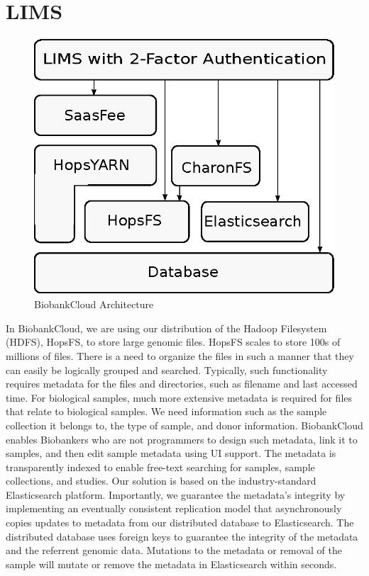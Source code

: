 \section{LIMS}

 \begin{figure}[h]
 \centering
 \includegraphics[scale=0.8]{./imgs/stack.eps}
 \caption{BiobankCloud Architecture}
 \label{fig:lim}
\end{figure}


In BiobankCloud, we are using our distribution of the Hadoop Filesystem (HDFS), HopsFS, to store large genomic files. HopsFS scales to store 100s of millions of files. There is a need to organize the files in such a manner that they can easily be logically grouped and searched. Typically, such functionality requires metadata for the files and directories, such as filename and last accessed time. For biological samples, much more extensive metadata is required for files that relate to biological samples. We need information such as the sample collection it belongs to, the type of sample, and donor information. BiobankCloud enables Biobankers who are not programmers to design such metadata, link it to samples, and then edit sample metadata using UI support. The metadata is transparently indexed to enable free-text searching for samples, sample collections, and studies. Our solution is based on the industry-standard Elasticsearch platform. Importantly, we guarantee the metadata's integrity by implementing an eventually consistent replication model that asynchronously copies updates to metadata from our distributed database to Elasticsearch. The distributed database uses foreign keys to guarantee the integrity of the metadata and the referrent genomic data. Mutations to the metadata or removal of the sample will mutate or remove the metadata in Elasticsearch within seconds.


